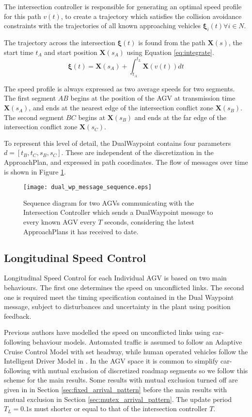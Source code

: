 The intersection controller is responsible for generating an optimal speed profile for this path $v(t)$, to create a trajectory which satisfies the collision avoidance constraints with the trajectories of all known approaching vehicles $\bm{\xi}_i(t) \forall i \in N$. 

The trajectory across the intersection $\bm{\xi}(t)$ is found from the path $\bm{X}(s)$, the start time $t_A$ and start position $\bm{X}(s_A)$ using Equation \ref{eq:integrate}.
\begin{equation}
	\bm{\xi}(t)  = \bm{X}(s_A) + \int_{t_A}^{t_L} \bm{X}\left( v(t) \right)  dt
	\label{eq:integrate}
\end{equation}

The speed profile is always expressed as two average speeds for two segments. The first segment $AB$ begins at the position of the AGV at transmission time $\bm{X}(s_A)$, and ends at the nearest edge of the intersection conflict zone $\bm{X}(s_B)$. The second segment $BC$ begins at $\bm{X}(s_B)$ and ends at the far edge of the intersection conflict zone $\bm{X}(s_C)$.  

To represent this level of detail, the DualWaypoint contains four parameters $d =[t_B, t_C, s_B, s_C]$. These are independent of the discretization in the ApproachPlan, and expressed in path coordinates. The flow of messages over time is shown in Figure \ref{fig:dual_wp_message_sequence}.

\begin{figure}[ht]
	\centering
	\texttt{[image: dual\_wp\_message\_sequence.eps]}
	\caption{Sequence diagram for two AGVs communicating with the Intersection Controller which sends a DualWaypoint message to every known AGV every $T$ seconds, considering the latest ApproachPlans it has received to date. }
	\label{fig:dual_wp_message_sequence}
\end{figure}


\subsection{Longitudinal Speed Control}
Longitudinal Speed Control for each Individual AGV is based on two main behaviours. The first one determines the speed on unconflicted links. The second one is required meet the timing specification contained in the Dual Waypoint message, subject to disturbances and uncertainty in the plant using position feedback.  

Previous authors have modelled the speed on unconflicted links using car-following behaviour models. Automated traffic is assumed to follow an Adaptive Cruise Control Model with set headway, while human operated vehicles follow the Intelligent Driver Model in \cite{Baz2020}. In the AGV space it is common to simplify car-following with mutual exclusion of discretized roadmap segments  \cite{Digani2014coord} so we follow this scheme for the main results. Some results with mutual exclusion turned off are given in  in Section \ref{sec:fixed_arrival_pattern} before the main results with mutual exclusion in Section \ref{sec:mutex_arrival_pattern}. The update period $T_L=0.1$s must shorter or equal to that of the intersection controller $T$. 

